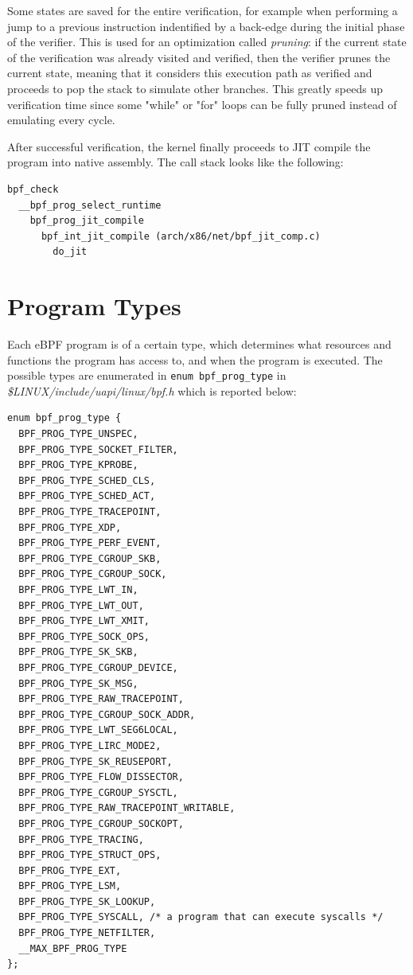 
Some states are saved for the entire verification, for example when performing a
jump to a previous instruction indentified by a back-edge during the initial
phase of the verifier. This is used for an optimization called \textit{pruning}:
if the current state of the verification was already visited and verified, then
the verifier prunes the current state, meaning that it considers this execution
path as verified and proceeds to pop the stack to simulate other branches. This
greatly speeds up verification time since some "while" or "for" loops can be
fully pruned instead of emulating every cycle.

After successful verification, the kernel finally proceeds to JIT compile the
program into native assembly. The call stack looks like the following:

\begin{verbatim}
bpf_check
  __bpf_prog_select_runtime
    bpf_prog_jit_compile
      bpf_int_jit_compile (arch/x86/net/bpf_jit_comp.c)
        do_jit
\end{verbatim}

\section{Program Types}

Each eBPF program is of a certain type, which determines what resources and
functions the program has access to, and when the program is executed. The
possible types are enumerated in \verb|enum bpf_prog_type| in
\textit{\$LINUX/include/uapi/linux/bpf.h} which is reported below:

\begin{verbatim}
enum bpf_prog_type {
  BPF_PROG_TYPE_UNSPEC,
  BPF_PROG_TYPE_SOCKET_FILTER,
  BPF_PROG_TYPE_KPROBE,
  BPF_PROG_TYPE_SCHED_CLS,
  BPF_PROG_TYPE_SCHED_ACT,
  BPF_PROG_TYPE_TRACEPOINT,
  BPF_PROG_TYPE_XDP,
  BPF_PROG_TYPE_PERF_EVENT,
  BPF_PROG_TYPE_CGROUP_SKB,
  BPF_PROG_TYPE_CGROUP_SOCK,
  BPF_PROG_TYPE_LWT_IN,
  BPF_PROG_TYPE_LWT_OUT,
  BPF_PROG_TYPE_LWT_XMIT,
  BPF_PROG_TYPE_SOCK_OPS,
  BPF_PROG_TYPE_SK_SKB,
  BPF_PROG_TYPE_CGROUP_DEVICE,
  BPF_PROG_TYPE_SK_MSG,
  BPF_PROG_TYPE_RAW_TRACEPOINT,
  BPF_PROG_TYPE_CGROUP_SOCK_ADDR,
  BPF_PROG_TYPE_LWT_SEG6LOCAL,
  BPF_PROG_TYPE_LIRC_MODE2,
  BPF_PROG_TYPE_SK_REUSEPORT,
  BPF_PROG_TYPE_FLOW_DISSECTOR,
  BPF_PROG_TYPE_CGROUP_SYSCTL,
  BPF_PROG_TYPE_RAW_TRACEPOINT_WRITABLE,
  BPF_PROG_TYPE_CGROUP_SOCKOPT,
  BPF_PROG_TYPE_TRACING,
  BPF_PROG_TYPE_STRUCT_OPS,
  BPF_PROG_TYPE_EXT,
  BPF_PROG_TYPE_LSM,
  BPF_PROG_TYPE_SK_LOOKUP,
  BPF_PROG_TYPE_SYSCALL, /* a program that can execute syscalls */
  BPF_PROG_TYPE_NETFILTER,
  __MAX_BPF_PROG_TYPE
};
\end{verbatim}

